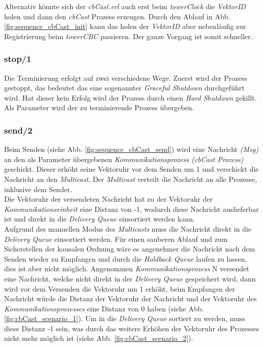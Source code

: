 Alternativ könnte sich der \textit{cbCast.erl} auch erst beim \textit{towerClock} die \textit{VektorID} holen und dann den \textit{cbCast} Prozess erzeugen. Durch den Ablauf in Abb. \ref{fig:sequence_cbCast_init} kann das holen der \textit{VektorID} aber nebenläufig zur Registrierung beim \textit{towerCBC} passieren. Der ganze Vorgang ist somit schneller.

\subsubsection{stop/1} \label{commModule_stop}

Die Terminierung erfolgt auf zwei verschiedene Wege. Zuerst wird der Prozess gestoppt, das bedeutet das eine sogenannter \textit{Graceful Shutdown} durchgeführt wird. Hat dieser kein Erfolg wird der Prozess durch einen \textit{Hard Shutdown} gekillt.\\
Als Parameter wird der zu terminierende Prozess übergeben.

\subsubsection{send/2}

Beim Senden (siehe Abb. \ref{fig:sequence_cbCast_send}) wird eine Nachricht \textit{(Msg)} an den als Parameter übergebenen \textit{Kommunikationsprozess (cbCast Prozess)} geschickt. Dieser erhöht seine Vektoruhr vor dem Senden um 1 und verschickt die Nachricht an den \textit{Multicast}. Der \textit{Multicast} verteilt die Nachricht an alle Prozesse, inklusive dem Sender.\\
Die Vektoruhr der versendeten Nachricht hat zu der Vektoruhr der \textit{Kommunikationseinheit} eine Distanz von -1, wodurch diese Nachricht auslieferbar ist und direkt in die \textit{Delivery Queue} einsortiert werden kann.\\
Aufgrund des manuellen Modus des \textit{Multicasts} muss die Nachricht direkt in die \textit{Delivery Queue} einsortiert werden. Für einen sauberen Ablauf und zum Sicherstellen der kausalen Ordnung wäre es angenehmer die Nachricht nach dem Senden wieder zu Empfangen und durch die \textit{Holdback Queue} laufen zu lassen, dies ist aber nicht möglich. Angenommen \textit{Kommunikationsprozess} N versendet eine Nachricht, welche nicht direkt in der \textit{Delivery Queue} gespeichert wird, dann wird vor dem Versenden die Vektoruhr um 1 erhöht, beim Empfangen der Nachricht würde die Distanz der Vektoruhr der Nachricht und der Vektoruhr des \textit{Kommunikationsprozesses} eine Distanz von 0 haben (siehe Abb. \ref{fig:cbCast_scenario_1}). Um in die \textit{Delivery Queue} sortiert zu werden, muss diese Distanz -1 sein, was durch das weitere Erhöhen der Vektoruhr des Prozesses nicht mehr möglich ist (siehe Abb. \ref{fig:cbCast_scenario_2}).

